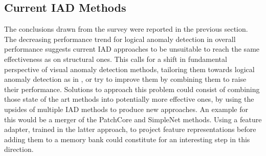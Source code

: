 \subsection{Current IAD Methods}
The conclusions drawn from the survey were reported in the previous section. The decreasing performance trend for logical anomaly detection in overall performance suggests 
current IAD approaches to be unsuitable to reach the same effectiveness as on structural ones. This calls for a shift in fundamental perspective of visual anomaly 
detection methods, tailoring them towards logical anomaly detection as in \cite{LOCODentsAndScratchesBergmann2022}, or try to improve them by combining them to raise their performance. Solutions to approach this problem could consist of combining 
those state of the art methods into potentially more effective ones, by using the upsides of multiple IAD methods to produce new approaches. An example for this would be a 
merger of the PatchCore \cite{patchCore2022} and SimpleNet \cite{liu2023simplenet} methods. Using a feature adapter, trained in the latter approach, to project feature 
representations before adding them to a memory bank could constitute for an interesting step in this direction. 

